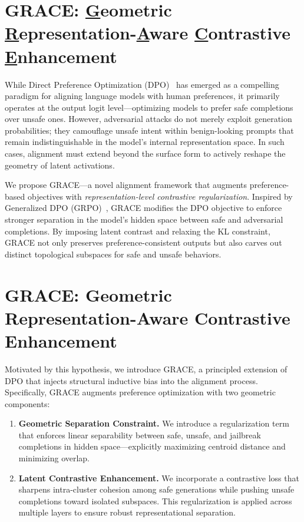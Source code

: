 




\clearpage
\newpage
\section{\textsc{GRACE}: \underline{G}eometric \underline{R}epresentation-\underline{A}ware \underline{C}ontrastive \underline{E}nhancement}

While Direct Preference Optimization (DPO)~\cite{rafailov2023direct} has emerged as a compelling paradigm for aligning language models with human preferences, it primarily operates at the output logit level—optimizing models to prefer safe completions over unsafe ones. However, adversarial attacks do not merely exploit generation probabilities; they camouflage unsafe intent within benign-looking prompts that remain indistinguishable in the model’s internal representation space. In such cases, alignment must extend beyond the surface form to actively reshape the geometry of latent activations.

We propose \textsc{GRACE}—a novel alignment framework that augments preference-based objectives with \textit{representation-level contrastive regularization}. Inspired by Generalized DPO (GRPO)~\cite{wu2024generalized}, \textsc{GRACE} modifies the DPO objective to enforce stronger separation in the model’s hidden space between safe and adversarial completions. By imposing latent contrast and relaxing the KL constraint, \textsc{GRACE} not only preserves preference-consistent outputs but also carves out distinct topological subspaces for safe and unsafe behaviors.









\section{\textsc{GRACE}: Geometric Representation-Aware Contrastive Enhancement}

Motivated by this hypothesis, we introduce \textsc{GRACE}, a principled extension of DPO that injects structural inductive bias into the alignment process. Specifically, \textsc{GRACE} augments preference optimization with two geometric components:

\begin{enumerate}
    \item \textbf{Geometric Separation Constraint.} We introduce a regularization term that enforces linear separability between safe, unsafe, and jailbreak completions in hidden space—explicitly maximizing centroid distance and minimizing overlap.
    
    \item \textbf{Latent Contrastive Enhancement.} We incorporate a contrastive loss that sharpens intra-cluster cohesion among safe generations while pushing unsafe completions toward isolated subspaces. This regularization is applied across multiple layers to ensure robust representational separation.
\end{enumerate}

